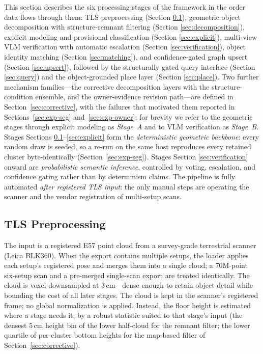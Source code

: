 \documentclass[electronics,article,accept,pdftex,moreauthors]{Definitions/mdpi}
\begin{document}
This section describes the six processing stages of the framework in the
order data flows through them: TLS preprocessing (Section \ref{sec:preprocess}),
geometric object decomposition with structure-remnant filtering
(Section \ref{sec:decomposition}), explicit modeling and provisional classification
(Section \ref{sec:explicit}), multi-view VLM verification with automatic escalation
(Section \ref{sec:verification}), object identity matching (Section \ref{sec:matching}), and
confidence-gated graph upsert (Section \ref{sec:upsert}), followed by the structurally
gated query interface (Section \ref{sec:query}) and the object-grounded place layer
(Section \ref{sec:place}). Two further mechanism families---the corrective
decomposition layers with the structure-condition ensemble, and the
owner-evidence revision path---are defined in Section~\ref{sec:corrective},
with the failures that motivated them reported in
Sections~\ref{sec:exp-seg} and~\ref{sec:exp-owner}; for brevity we refer
to the geometric stages through explicit modeling as \emph{Stage~A} and
to VLM verification as \emph{Stage~B}. Stages Sections \ref{sec:preprocess}--\ref{sec:explicit} form the
\emph{deterministic geometric backbone}: every random draw is seeded, so a
re-run on the same host reproduces every retained cluster byte-identically
(Section~\ref{sec:exp-seg}). Stages Section \ref{sec:verification} onward are \emph{probabilistic
semantic inference}, controlled by voting, escalation, and confidence gating
rather than by determinism claims. The pipeline is fully automated
\emph{after registered TLS input}: the only manual steps are operating the
scanner and the vendor registration of multi-setup scans.

\subsection{TLS Preprocessing}
\label{sec:preprocess}

The input is a registered E57 point cloud from a survey-grade terrestrial
scanner (Leica BLK360). When the export contains multiple setups, the loader
applies each setup's registered pose and merges them into a single cloud; a
70M-point six-setup scan and a pre-merged single-scan export are treated
identically. The cloud is voxel-downsampled at 3\,cm---dense enough to retain
object detail while bounding the cost of all later stages. The cloud is kept
in the scanner's registered frame; no global normalization is applied.
Instead, the floor height is estimated where a stage needs it, by a robust
statistic suited to that stage's input (the densest 5\,cm height bin of the
lower half-cloud for the remnant filter; the lower quartile of per-cluster
bottom heights for the map-based filter of
Section~\ref{sec:corrective}).
\end{document}
